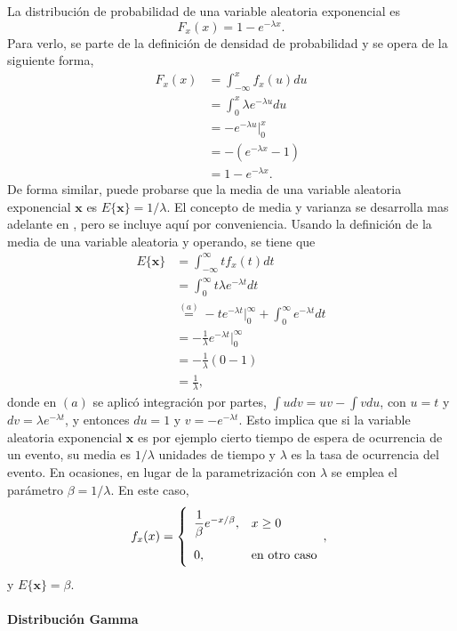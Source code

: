 \documentclass[a4paper]{report}
\newcommand{\x}{\mathbf{x}}
\begin{document}
La distribución de probabilidad de una variable aleatoria exponencial es
\[
 F_x(x)=1-e^{-\lambda x}.
\]
Para verlo, se parte de la definición de densidad de probabilidad y se opera de la siguiente forma,
\begin{align*}
 F_x(x)&=\int_{-\infty}^{x}f_x(u)du\\
       &=\int_{0}^{x}\lambda e^{-\lambda u}du\\
       &=-e^{-\lambda u}\Big|_{0}^{x}\\
       &=-\left(e^{-\lambda x}-1\right)\\
       &=1-e^{-\lambda x}.
\end{align*}
De forma similar, puede probarse que la media de una variable aleatoria exponencial \(\x\) es \(E\{\x\}=1/\lambda\). El concepto de media y varianza se desarrolla mas adelante en \cite{papoulis2002probability}, pero se incluye aquí por conveniencia. Usando la definición de la media de una variable aleatoria y operando, se tiene que
\begin{align*}
 E\{\x\}&=\int_{-\infty}^{\infty}tf_x(t)dt\\
        &=\int_{0}^{\infty}t\lambda e^{-\lambda t}dt\\
        &\overset{(a)}{=}-te^{-\lambda t}\Big|_{0}^{\infty}+\int_{0}^{\infty}e^{-\lambda t}dt\\
        &=-\frac{1}{\lambda}e^{-\lambda t}\Big|_{0}^{\infty}\\
        &=-\frac{1}{\lambda}(0-1)\\
        &=\frac{1}{\lambda},
\end{align*}
donde en \((a)\) se aplicó integración por partes, \(\int udv=uv-\int vdu\), con \(u=t\) y \(dv=\lambda e^{-\lambda t}\), y entonces \(du=1\) y \(v=-e^{-\lambda t}\). Esto implica que si la variable aleatoria exponencial \(\x\) es por ejemplo cierto tiempo de espera de ocurrencia de un evento, su media es \(1/\lambda\) unidades de tiempo y \(\lambda\) es la tasa de ocurrencia del evento. En ocasiones, en lugar de la parametrización con \(\lambda\) se emplea el parámetro \(\beta=1/\lambda\). En este caso, 
\[\def\arraystretch{2.0}
 f_x(x)=
 \left\{\begin{array}{ll}
  \dfrac{1}{\beta} e^{-x/\beta}, & x\geq 0\\
  0, & \textrm{en otro caso}
 \end{array}, \right.
\]
y \(E\{\x\}=\beta\).

\paragraph{Distribución Gamma}
\end{document}
